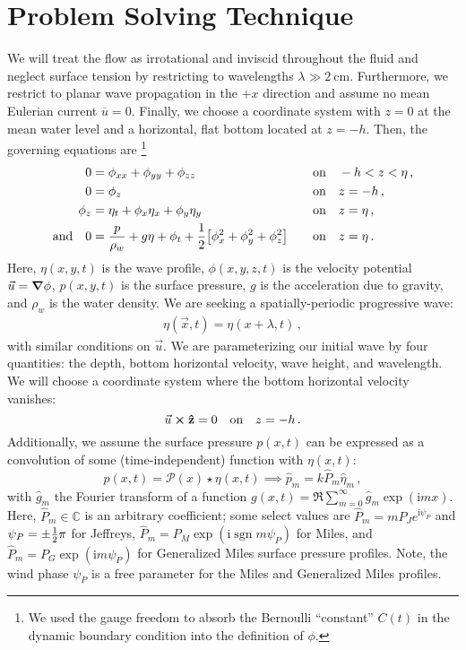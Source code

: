 \documentclass{jfm}
\let\Oldsection\section
\renewcommand{\section}{\FloatBarrier\Oldsection}
\newcommand{\GenP}{\hat{P}_m}
\DeclareMathOperator{\sgn}{sgn}
\newcommand{\im}{\mathrm{i}}
\begin{document}
\section{Problem Solving Technique}
We will treat the flow as irrotational and inviscid throughout the
fluid and neglect surface tension by restricting to wavelengths $\lambda
\gg \SI{2}{\centi\meter}$.
Furthermore, we restrict to planar wave propagation in the $+x$
direction and assume no mean Eulerian current $\overline{u} = 0$.
Finally, we choose a coordinate system with $z=0$ at the mean water level and
a horizontal, flat bottom located at $z=-h$.
Then, the governing equations are%
\footnote{
  We used the gauge freedom to absorb the Bernoulli ``constant'' $C(t)$
  in the dynamic boundary condition into the definition of $\phi$.
}
\begin{alignat}{2}
  0 &= \phi_{xx} + \phi_{yy} + \phi_{zz} &&\qq{on}
  -h < z < \eta \,, \label{eq:laplace}\\
  0 &= \phi_{z} &&\qq{on} z=-h \,, \label{eq:bottom_bc}\\
  \phi_{z} &= \eta_{t} + \phi_{x} \eta_{x} +
  \phi_{y} \eta_{y} &&\qq{on} z = \eta \,, \label{eq:kinematic_bc}\\
  \qq*{and} 0 &= \frac{p}{\rho_w} + g\eta + \phi_{t} +
  \frac{1}{2} \bqty{\phi_{x}^2 + \phi_{y}^2 + \phi_{z}^2} &&\qq{on} z=
  \eta \,. \label{eq:dynamic_bc}
\end{alignat}
Here, $\eta(x,y,t)$ is the wave profile, $\phi(x,y,z,t)$ is the velocity
potential $\vec{u} = \grad{\phi}$, $p(x,y,t)$ is the surface pressure,
$g$ is the acceleration due to gravity, and $\rho_w$ is the water
density.
We are seeking a spatially-periodic progressive wave:
\begin{gather}
  \eta(\vec{x},t) = \eta(x + \lambda, t) \,,
\end{gather}
with similar conditions on $\vec{u}$.
We are parameterizing our initial wave by four quantities: the depth,
bottom horizontal velocity, wave height, and wavelength.
We will choose a coordinate system where the bottom horizontal velocity
vanishes:
\begin{equation}
  \vec{u}\cross \vu{z} = 0 \qq{on} z=-h \,. \label{eq:bot_bc_horz}
\end{equation}
Additionally, we assume the surface pressure $p(x,t)$ can be expressed
as a convolution of some (time-independent) function with $\eta(x,t)$:
\begin{equation}
  p(x,t) = \mathcal{P}(x) \star \eta(x,t) \implies \hat{p}_m = k \GenP
    \hat{\eta}_m \,,
\end{equation}
with $\hat{g}_m$ the Fourier transform of a function $g(x,t) =
\Re{\sum_{m=0}^{\infty} \hat{g}_m \exp(\im m x)}$.
Here, $\GenP \in \mathbb{C}$ is an arbitrary coefficient; some select
values are
$\GenP = m P_J e^{\im \psi_P}$ and $\psi_P = \pm {\textstyle\frac{1}{2}} \pi$
for Jeffreys, $\GenP = P_M \exp(\im \sgn{m} \psi_P)$ for Miles, and
$\GenP = P_G \exp(\im m \psi_P)$ for Generalized Miles surface pressure
profiles.
Note, the wind phase $\psi_P$ is a free parameter for the Miles and
Generalized Miles profiles.
\end{document}
